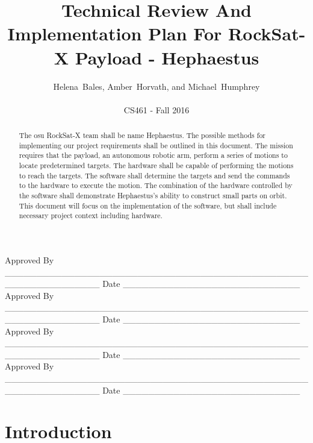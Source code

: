 \documentclass[letterpaper,10pt]{article}
\title{Technical Review And Implementation Plan For RockSat-X Payload - Hephaestus}
\author{Helena~Bales, Amber~Horvath, and Michael~Humphrey\\ \\ CS461 - Fall 2016}
\newenvironment{bottompar}{\par\vspace*{\fill}}{\clearpage}
\begin{document}
\maketitle

\begin{abstract}
The \gls{osu} RockSat-X team shall be name Hephaestus.
The possible methods for implementing our project requirements shall be outlined in this document.
The mission requires that the \gls{payload}, an autonomous robotic arm, perform a series of motions to locate predetermined targets.
The hardware shall be capable of performing the motions to reach the targets.
The software shall determine the targets and send the commands to the hardware to execute the motion.
The combination of the hardware controlled by the software shall demonstrate Hephaestus's ability to construct small parts on orbit.
This document will focus on the implementation of the software, but shall include necessary project context including hardware.
\end{abstract}

\begin{bottompar}
Approved By
\_\_\_\_\_\_\_\_\_\_\_\_\_\_\_\_\_\_\_\_\_\_\_\_\_\_\_\_\_\_\_\_\_\_\_\_\_\_\_\_\_\_\_\_\_\_\_\_\_\_\_\_\_\_\_\_\_\_\_\_\_\_\_
Date \_\_\_\_\_\_\_\_\_\_\_\_\_\_\_\_\_\_\_\_\_\_\_\_\_\_\_\_ \\


Approved By
\_\_\_\_\_\_\_\_\_\_\_\_\_\_\_\_\_\_\_\_\_\_\_\_\_\_\_\_\_\_\_\_\_\_\_\_\_\_\_\_\_\_\_\_\_\_\_\_\_\_\_\_\_\_\_\_\_\_\_\_\_\_\_
Date \_\_\_\_\_\_\_\_\_\_\_\_\_\_\_\_\_\_\_\_\_\_\_\_\_\_\_\_ \\


Approved By
\_\_\_\_\_\_\_\_\_\_\_\_\_\_\_\_\_\_\_\_\_\_\_\_\_\_\_\_\_\_\_\_\_\_\_\_\_\_\_\_\_\_\_\_\_\_\_\_\_\_\_\_\_\_\_\_\_\_\_\_\_\_\_
Date \_\_\_\_\_\_\_\_\_\_\_\_\_\_\_\_\_\_\_\_\_\_\_\_\_\_\_\_ \\


Approved By
\_\_\_\_\_\_\_\_\_\_\_\_\_\_\_\_\_\_\_\_\_\_\_\_\_\_\_\_\_\_\_\_\_\_\_\_\_\_\_\_\_\_\_\_\_\_\_\_\_\_\_\_\_\_\_\_\_\_\_\_\_\_\_
Date \_\_\_\_\_\_\_\_\_\_\_\_\_\_\_\_\_\_\_\_\_\_\_\_\_\_\_\_ \\
\end{bottompar}

\clearpage
\tableofcontents
\clearpage

\section{Introduction}
\end{document}
